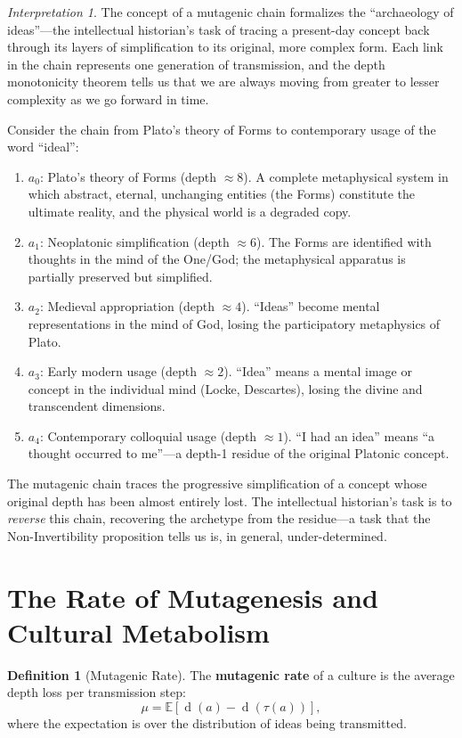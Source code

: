 \documentclass[11pt,openany]{book}
\theoremstyle{definition}
\newtheorem{definition}[axiom]{Definition}
\theoremstyle{plain}
\theoremstyle{remark}
\newtheorem{interpretation}[axiom]{Interpretation}
\newcommand{\depth}{\operatorname{d}}       %
\newcommand{\transmit}{\tau}                 %
\begin{document}
\begin{interpretation}
The concept of a mutagenic chain formalizes the ``archaeology of ideas''---the intellectual historian's task of tracing a present-day concept back through its layers of simplification to its original, more complex form. Each link in the chain represents one generation of transmission, and the depth monotonicity theorem tells us that we are always moving from greater to lesser complexity as we go forward in time.

Consider the chain from Plato's theory of Forms to contemporary usage of the word ``ideal'':
\begin{enumerate}
\item $a_0$: Plato's theory of Forms (depth $\approx 8$). A complete metaphysical system in which abstract, eternal, unchanging entities (the Forms) constitute the ultimate reality, and the physical world is a degraded copy.
\item $a_1$: Neoplatonic simplification (depth $\approx 6$). The Forms are identified with thoughts in the mind of the One/God; the metaphysical apparatus is partially preserved but simplified.
\item $a_2$: Medieval appropriation (depth $\approx 4$). ``Ideas'' become mental representations in the mind of God, losing the participatory metaphysics of Plato.
\item $a_3$: Early modern usage (depth $\approx 2$). ``Idea'' means a mental image or concept in the individual mind (Locke, Descartes), losing the divine and transcendent dimensions.
\item $a_4$: Contemporary colloquial usage (depth $\approx 1$). ``I had an idea'' means ``a thought occurred to me''---a depth-1 residue of the original Platonic concept.
\end{enumerate}
The mutagenic chain traces the progressive simplification of a concept whose original depth has been almost entirely lost. The intellectual historian's task is to \emph{reverse} this chain, recovering the archetype from the residue---a task that the Non-Invertibility proposition tells us is, in general, under-determined.
\end{interpretation}

\section{The Rate of Mutagenesis and Cultural Metabolism}

\begin{definition}[Mutagenic Rate]
The \textbf{mutagenic rate} of a culture is the average depth loss per transmission step:
\[
\mu = \mathbb{E}[\depth(a) - \depth(\transmit(a))],
\]
where the expectation is over the distribution of ideas being transmitted.
\end{definition}
\end{document}
